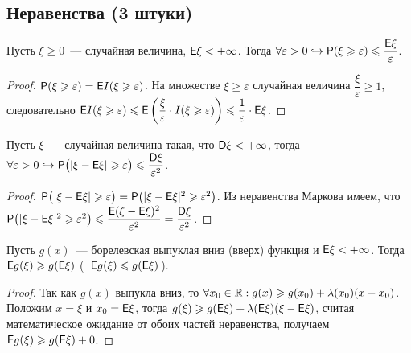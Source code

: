 \subsection{Неравенства (3 штуки)}
\begin{lemma}
	Пусть $\xi \geqslant 0$~--- случайная величина, $\mathsf{E} \xi < +\infty$. Тогда $\forall \varepsilon > 0 \hookrightarrow \mathsf{P} (\xi \geqslant \varepsilon ) \leqslant \dfrac{\mathsf{E} \xi}{\varepsilon}$.
	\begin{proof}
		$\mathsf{P} (\xi \geqslant \varepsilon ) = \mathsf{E} I(\xi \geqslant \varepsilon)$. На множестве ${ \xi \geqslant \varepsilon}$ случайная величина $\dfrac{\xi}{\varepsilon} \geqslant 1$, следовательно $\mathsf{E} I(\xi \geqslant \varepsilon) \leqslant \mathsf{E} \left( \dfrac{\xi}{\varepsilon} \cdot I (\xi \geqslant \varepsilon) \right) \leqslant \dfrac{1}{\varepsilon} \cdot  \mathsf{E} \xi$.
	\end{proof}
\end{lemma}

\begin{lemma}
	Пусть $\xi$~--- случайная величина такая, что $\mathsf{D} \xi < + \infty$, тогда $\forall \varepsilon > 0 \hookrightarrow \mathsf{P} \big(|\xi - \mathsf{E} \xi | \geqslant \varepsilon \big) \leqslant \dfrac{\mathsf{D} \xi}{\varepsilon^2}$.
	\begin{proof}
		$\mathsf{P} \big(|\xi - \mathsf{E} \xi | \geqslant \varepsilon\big) = \mathsf{P} \big( | \xi - \mathsf{E} \xi |^2 \geqslant \varepsilon^2 \big)$. Из неравенства Маркова имеем, что $\mathsf{P} \big( | \xi - \mathsf{E} \xi |^2 \geqslant \varepsilon^2 \big) \leqslant \dfrac{\mathsf{E} (\xi - \mathsf{E} \xi )^2}{\varepsilon^2} = \dfrac{\mathsf{D} \xi}{\varepsilon^2}$.
	\end{proof} 
\end{lemma}

\begin{lemma}
	Пусть $g(x)$~--- борелевская выпуклая вниз (вверх) функция и $\mathsf{E} \xi < +\infty$. 
	Тогда $\mathsf{E} g(\xi) \geqslant g(\mathsf{E} \xi )$ (~$\mathsf{E} g(\xi) \leqslant g(\mathsf{E} \xi )$\,).
	\begin{proof}
		Так как $g(x)$ выпукла вниз, то $\forall x_0 \in \mathbb{R} : g(x) \geqslant g(x_0) + \lambda(x_0)(x - x_0)$. Положим $x = \xi$ и $x_0 = \mathsf{E} \xi$, тогда $g(\xi) \geqslant g(\mathsf{E} \xi) + \lambda(\mathsf{E} \xi)(\xi - \mathsf{E} \xi)$, считая математическое ожидание от обоих частей неравенства, получаем $\mathsf{E} g(\xi) \geqslant g( \mathsf{E} \xi ) + 0$.
	\end{proof}
\end{lemma}


